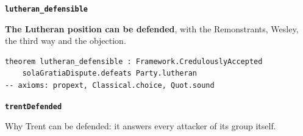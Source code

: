 \documentclass[11pt]{article}
\begin{document}
\par\medskip\noindent\textbf{\texttt{lutheran\_\allowbreak{}defensible}}\par\nobreak\noindent
\textbf{The Lutheran position can be defended}, with the Remonstrants, Wesley, the third way and the objection.

{\small\begin{verbatim}
theorem lutheran_defensible : Framework.CredulouslyAccepted
    solaGratiaDispute.defeats Party.lutheran
-- axioms: propext, Classical.choice, Quot.sound
\end{verbatim}}
\par\medskip\noindent\textbf{\texttt{trent\allowbreak{}Defended}}\par\nobreak\noindent
Why Trent can be defended: it answers every attacker of its group itself.
\end{document}
